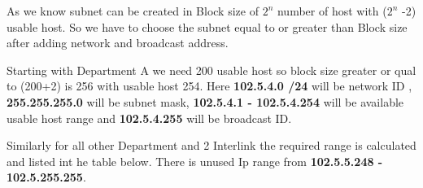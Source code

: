 \documentclass[a4paper,11pt]{article}
\begin{document}
\begin{A}
    {

        As we know subnet can be created in Block size of $2^n$ number of host with ($2^n$ -2) usable host. So we have to choose the subnet equal to or greater than Block size after adding network and broadcast address.

        Starting with Department A we need 200 usable host so block size greater or qual to (200+2) is 256 with usable host 254.  Here \textbf{102.5.4.0 /24} will be network ID , \textbf{255.255.255.0 }will be subnet mask, \textbf{102.5.4.1 - 102.5.4.254} will  be available usable host range and \textbf{102.5.4.255} will be broadcast ID.

        Similarly for all other Department and 2 Interlink the required range is calculated and listed int he table below.
        There is unused Ip range from \textbf{102.5.5.248 - 102.5.255.255}.


}
\end{A}
\end{document}
